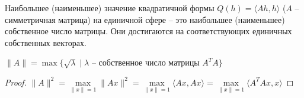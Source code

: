 \begin{theorem}
    Наибольшее (наименьшее) значение квадратичной формы $Q(h)=\langle Ah, h\rangle$ ($A$ – симметричная матрица) на единичной сфере – это наибольшее (наименьшее) собственное число матрицы. Они достигаются на соответствующих единичных собственных векторах.
\end{theorem}
\begin{corollary}
    $\|A\|=\max \{\sqrt{\lambda}\mid \lambda \text{ – собственное число матрицы }A^TA\}$
\end{corollary}
\begin{proof}
    $\|A\|^2=\max\limits_{\|x\|=1}\|Ax\|^2 =\max\limits_{\|x\|=1} \langle Ax, Ax\rangle= \max\limits_{\|x\|=1}\langle A^TAx, x\rangle$
\end{proof}